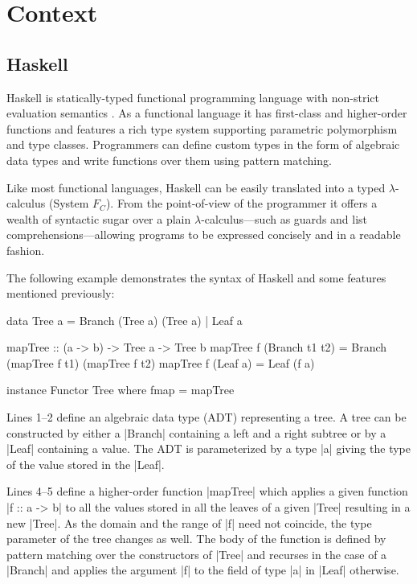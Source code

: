 \chapter{Context}\label{chapcontext}


\section{Haskell}

Haskell is statically-typed functional programming language with non-strict evaluation semantics \cite{Haskell98}. As a functional language it has first-class and higher-order functions and features a rich type system supporting parametric polymorphism and type classes. Programmers can define custom types in the form of algebraic data types and write functions over them using pattern matching.

Like most functional languages, Haskell can be easily translated into a typed $\lambda$-calculus (System $F_C$). From the point-of-view of the programmer it offers a wealth of syntactic sugar over a plain $\lambda$-calculus---such as guards and list comprehensions---allowing programs to be expressed concisely and in a readable fashion.

The following example demonstrates the syntax of Haskell and some features mentioned previously:

\begin{code}
data Tree a  =  Branch (Tree a) (Tree a)
             |  Leaf a
             
mapTree :: (a -> b) -> Tree a -> Tree b
mapTree f (Branch t1 t2)  = Branch (mapTree f t1) (mapTree f t2)
mapTree f (Leaf a)        = Leaf (f a)

instance Functor Tree where
    fmap = mapTree
\end{code}
Lines 1--2 define an algebraic data type (ADT) representing a tree. A tree can be constructed by either a |Branch| containing a left and a right subtree or by a |Leaf| containing a value. The ADT is parameterized by a type |a| giving the type of the value stored in the |Leaf|.

Lines 4--5 define a higher-order function |mapTree| which applies a given function |f :: a -> b| to all the values stored in all the leaves of a given |Tree| resulting in a new |Tree|. As the domain and the range of |f| need not coincide, the type parameter of the tree changes as well. The body of the function is defined by pattern matching over the constructors of |Tree| and recurses in the case of a |Branch| and applies the argument |f| to the field of type |a| in |Leaf| otherwise.


